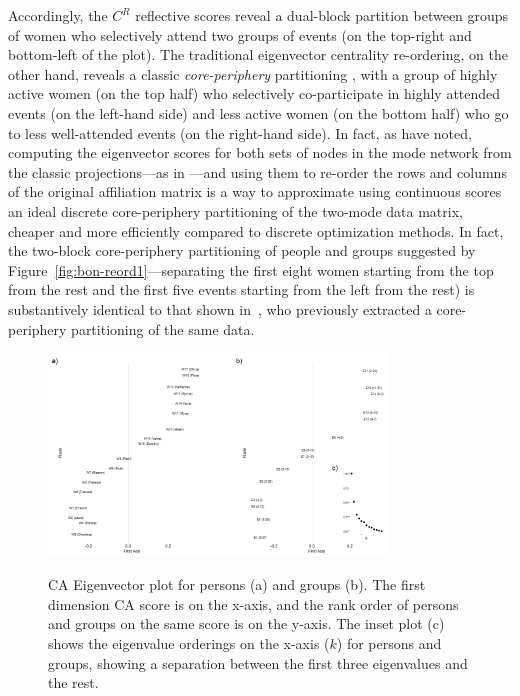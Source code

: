 \documentclass[a4paper,fleqn]{cas-sc}
\begin{document}
Accordingly, the $C^R$ reflective scores reveal a dual-block partition between groups of women who selectively attend two groups of events (on the top-right and bottom-left of the plot). The traditional eigenvector centrality re-ordering, on the other hand, reveals a classic \textit{core-periphery} partitioning \citep{borgatti2000models}, with a group of highly active women (on the top half) who selectively co-participate in highly attended events (on the left-hand side) and less active women (on the bottom half) who go to less well-attended events (on the right-hand side). In fact, as \citet[p. 206]{everett2013dual} have noted, computing the eigenvector scores for both sets of nodes in the mode network from the classic \citet{breiger1974duality} projections---as in \citet{bonacich1991simultaneous}---and using them to re-order the rows and columns of the original affiliation matrix is a way to approximate using continuous scores an ideal discrete core-periphery partitioning of the two-mode data matrix, cheaper and more efficiently compared to discrete optimization methods. In fact, the two-block core-periphery partitioning of people and groups suggested by Figure~\ref{fig:bon-reord1}---separating the first eight women starting from the top from the rest and the first five events starting from the left from the rest) is substantively identical to that shown in~\citet[206, Table 2]{everett2013dual}, who previously extracted a core-periphery partitioning of the same data.

\begin{figure}[ht!]
    \centering
        \includegraphics[width=0.8\textwidth]{Plots/ca-eigvec.png}            
        \label{fig:eigvec}
    \caption{CA Eigenvector plot for persons (a) and groups (b). The first dimension CA score is on the x-axis, and the rank order of persons and groups on the same score is on the y-axis. The inset plot (c) shows the eigenvalue orderings on the x-axis ($k$) for persons and groups, showing a separation between the first three eigenvalues and the rest.}
    \label{fig:ca-eigvec}
\end{figure}
\end{document}
